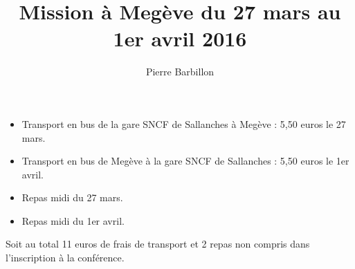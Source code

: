 \documentclass[12pt]{article}
\title{Mission à Megève du 27 mars au 1er avril 2016}
\author{Pierre Barbillon}
\date{}
\begin{document}
\maketitle 



\begin{itemize}
\item Transport en bus de la gare SNCF de Sallanches à Megève : 5,50 euros le 27 mars.
\item Transport en bus de Megève à la gare SNCF de Sallanches : 5,50 euros le 1er avril.
\item Repas midi du 27 mars.
\item Repas midi du 1er avril.


\end{itemize}

\bigskip
Soit au total 11 euros de frais de transport et 2 repas non compris dans l'inscription à la conférence.
\end{document}
